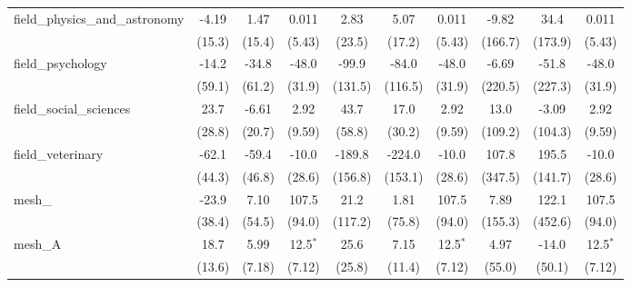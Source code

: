 \begin{tabular}{lccccccccc}
   field\_physics\_and\_astronomy                              & -4.19         & 1.47          & 0.011         & 2.83           & 5.07          & 0.011         & -9.82   & 34.4      & 0.011\\   
                                                               & (15.3)        & (15.4)        & (5.43)        & (23.5)         & (17.2)        & (5.43)        & (166.7) & (173.9)   & (5.43)\\   
   field\_psychology                                           & -14.2         & -34.8         & -48.0         & -99.9          & -84.0         & -48.0         & -6.69   & -51.8     & -48.0\\   
                                                               & (59.1)        & (61.2)        & (31.9)        & (131.5)        & (116.5)       & (31.9)        & (220.5) & (227.3)   & (31.9)\\   
   field\_social\_sciences                                     & 23.7          & -6.61         & 2.92          & 43.7           & 17.0          & 2.92          & 13.0    & -3.09     & 2.92\\   
                                                               & (28.8)        & (20.7)        & (9.59)        & (58.8)         & (30.2)        & (9.59)        & (109.2) & (104.3)   & (9.59)\\   
   field\_veterinary                                           & -62.1         & -59.4         & -10.0         & -189.8         & -224.0        & -10.0         & 107.8   & 195.5     & -10.0\\   
                                                               & (44.3)        & (46.8)        & (28.6)        & (156.8)        & (153.1)       & (28.6)        & (347.5) & (141.7)   & (28.6)\\   
   mesh\_                                                      & -23.9         & 7.10          & 107.5         & 21.2           & 1.81          & 107.5         & 7.89    & 122.1     & 107.5\\   
                                                               & (38.4)        & (54.5)        & (94.0)        & (117.2)        & (75.8)        & (94.0)        & (155.3) & (452.6)   & (94.0)\\   
   mesh\_A                                                     & 18.7          & 5.99          & 12.5$^{*}$    & 25.6           & 7.15          & 12.5$^{*}$    & 4.97    & -14.0     & 12.5$^{*}$\\   
                                                               & (13.6)        & (7.18)        & (7.12)        & (25.8)         & (11.4)        & (7.12)        & (55.0)  & (50.1)    & (7.12)\\   

\end{tabular}
